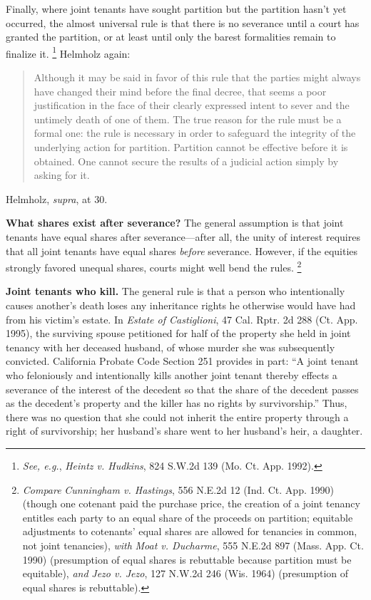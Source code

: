 Finally, where joint tenants have sought partition but the partition hasn't yet
occurred, the almost universal rule is that there is no severance until a court
has granted the partition, or at least until only the barest formalities remain
to finalize it. \footnote{\textit{See, e.g.}, \emph{Heintz v. Hudkins}, 824
S.W.2d 139 (Mo. Ct. App. 1992).} Helmholz again:
\begin{quote}
Although it may be said in favor of this rule that the parties might always have
changed their mind before the final decree, that seems a poor justification in
the face of their clearly expressed intent to sever and the untimely death of
one of them. The true reason for the rule must be a formal one: the rule is
necessary in order to safeguard the integrity of the underlying action for
partition. Partition cannot be effective before it is obtained. One cannot
secure the results of a judicial action simply by asking for it.
\end{quote}
Helmholz, \textit{supra}, at 30.


\item \textbf{What shares exist after severance?} The general assumption is that
joint tenants have equal shares after severance---after all, the unity of
interest requires that all joint tenants have equal shares \textit{before}
severance. However, if the equities strongly favored unequal shares, courts
might well bend the rules. \footnote{\textit{Compare} \emph{Cunningham v.
Hastings}, 556 N.E.2d 12 (Ind. Ct. App. 1990) (though one cotenant paid the
purchase price, the creation of a joint tenancy entitles each party to an equal
share of the proceeds on partition; equitable adjustments to cotenants' equal
shares are allowed for tenancies in common, not joint tenancies), \textit{with}
\emph{Moat v. Ducharme}, 555 N.E.2d 897 (Mass. App. Ct. 1990) (presumption of
equal shares is rebuttable because partition must be equitable), \textit{and}
\emph{Jezo v. Jezo}, 127 N.W.2d 246 (Wis. 1964) (presumption of equal shares is
rebuttable).}


\item \textbf{Joint tenants who kill.} The general rule is that a person who
intentionally causes another's death loses any inheritance rights he otherwise
would have had from his victim's estate. In \textit{Estate of Castiglioni}, 47
Cal. Rptr. 2d 288 (Ct. App. 1995), the surviving spouse petitioned for half of
the property she held in joint tenancy with her deceased husband, of whose
murder she was subsequently convicted. California Probate Code Section 251
provides in part: ``A joint tenant who feloniously and intentionally kills
another joint tenant thereby effects a severance of the interest of the
decedent so that the share of the decedent passes as the decedent's property
and the killer has no rights by survivorship.'' Thus, there was no question
that she could not inherit the entire property through a right of survivorship;
her husband's share went to her husband's heir, a daughter.


